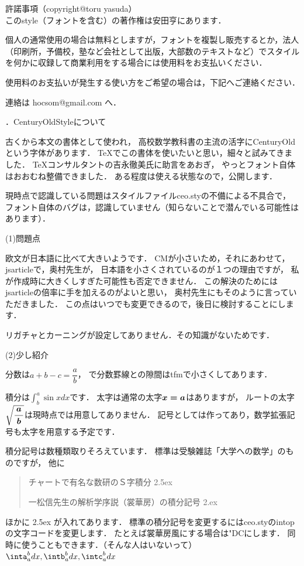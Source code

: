\documentclass [10pt,fleqn,b5j]{jsarticlek}
\begin{document}
\noindent
許諾事項（copyright@toru yasuda）
\\

このstyle（フォントを含む）の著作権は安田亨にあります．

個人の通常使用の場合は無料としますが，フォントを複製し販売するとか，法人（印刷所，予備校，塾など会社として出版，大部数のテキストなど）でスタイルを何かに収録して商業利用をする場合には使用料をお支払いください．

使用料のお支払いが発生する使い方をご希望の場合は，下記へご連絡ください．

連絡は hocsom@gmail.com へ．

\bigskip

．CenturyOldStyleについて

古くから本文の書体として使われ，
高校数学教科書の主流の活字にCenturyOldという字体があります．
TeXでこの書体を使いたいと思い，細々と試みてきました．
TeXコンサルタントの吉永徹美氏に助言をあおぎ，
やっとフォント自体はおおむね整備できました．
ある程度は使える状態なので，公開します．

現時点で認識している問題はスタイルファイルceo.styの不備による不具合で，
フォント自体のバグは，認識していません（知らないことで潜んでいる可能性はあります）．

\bigskip

\noindent
(1)問題点

欧文が日本語に比べて大きいようです．
CMが小さいため，それにあわせて，jsarticleで，奥村先生が，
日本語を小さくされているのが１つの理由ですが，
私が作成時に大きくしすぎた可能性も否定できません．
この解決のためにはjsarticleの倍率に手を加えるのがよいと思い，
奥村先生にもそのように言っていただきました．
この点はいつでも変更できるので，後日に検討することにします．

リガチャとカーニングが設定してありません．その知識がないためです．

\bigskip

\noindent
(2)少し紹介

\noindent
{}
分数は$a+b-c=\dfrac{a}{b}$，
で分数罫線との隙間はtfmで小さくしてあります．

積分は$\displaystyle\int^{a}_{b}\sin xdx$です．
太字は通常の太字$\mbox{\boldmath$x=a$}$はありますが，
ルートの太字$\bd{\sqrt{\dfrac{a}{b}}}$は現時点では用意してありません．
記号としては作ってあり，数学拡張記号も太字を用意する予定です．

積分記号は数種類取りそろえています．
標準は受験雑誌「大学への数学」のものですが，
他に
\begin{quote}
  チャートで有名な数研のＳ字積分 \raise2.5ex\hbox{}

  一松信先生の解析学序説（裳華房）の積分記号 \raise2.ex\hbox{}
\end{quote}
ほかに \raise2.5ex\hbox{} が入れてあります．
標準の積分記号を変更するにはceo.styのintopの文字コードを変更します．
たとえば裳華房風にする場合は"DCにします．
同時に使うこともできます．（そんな人はいないって）
$\inta_{a}^{b}dx,\intb_{a}^{b}dx,\intc_{a}^{b}dx$
\end{document}
